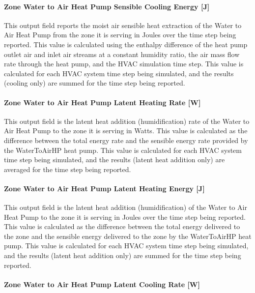 \paragraph{Zone Water to Air Heat Pump Sensible Cooling Energy {[}J{]}}\label{zone-water-to-air-heat-pump-sensible-cooling-energy-j}

This output field reports the moist air sensible heat extraction of the Water to Air Heat Pump from the zone it is serving in Joules over the time step being reported. This value is calculated using the enthalpy difference of the heat pump outlet air and inlet air streams at a constant humidity ratio, the air mass flow rate through the heat pump, and the HVAC simulation time step. This value is calculated for each HVAC system time step being simulated, and the results (cooling only) are summed for the time step being reported.

\paragraph{Zone Water to Air Heat Pump Latent Heating Rate {[}W{]}}\label{zone-water-to-air-heat-pump-latent-heating-rate-w}

This output field is the latent heat addition (humidification) rate of the Water to Air Heat Pump to the zone it is serving in Watts. This value is calculated as the difference between the total energy rate and the sensible energy rate provided by the WaterToAirHP heat pump. This value is calculated for each HVAC system time step being simulated, and the results (latent heat addition only) are averaged for the time step being reported.

\paragraph{Zone Water to Air Heat Pump Latent Heating Energy {[}J{]}}\label{zone-water-to-air-heat-pump-latent-heating-energy-j}

This output field is the latent heat addition (humidification) of the Water to Air Heat Pump to the zone it is serving in Joules over the time step being reported. This value is calculated as the difference between the total energy delivered to the zone and the sensible energy delivered to the zone by the WaterToAirHP heat pump. This value is calculated for each HVAC system time step being simulated, and the results (latent heat addition only) are summed for the time step being reported.

\paragraph{Zone Water to Air Heat Pump Latent Cooling Rate {[}W{]}}\label{zone-water-to-air-heat-pump-latent-cooling-rate-w}

